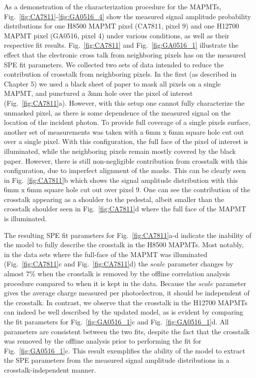 As a demonstration of the characterization procedure for the MAPMTs, Fig.~\ref{fig:CA7811}-\ref{fig:GA0516_4} show the measured signal amplitude probability distributions for one H8500 MAPMT pixel (CA7811, pixel 9) and one H12700 MAPMT pixel (GA0516, pixel 4) under various conditions, as well as their respective fit results. 
Fig.~\ref{fig:CA7811} and Fig.~\ref{fig:GA0516_1} illustrate the effect that the electronic cross talk from neighboring pixels has on the measured SPE fit parameters. 
We collected two sets of data intended to reduce the contribution of crosstalk from neighboring pixels. 
In the first (as described in Chapter 5) we used a black sheet of paper to mask all pixels on a single MAPMT, and punctured a 3mm hole over the pixel of interest (Fig.~\ref{fig:CA7811}a). 
However, with this setup one cannot fully characterize the unmasked pixel, as there is some dependence of the measured signal on the location of the incident photon. 
To provide full coverage of a single pixel\textquotesingle s surface, another set of measurements was taken with a 6mm x 6mm square hole cut out over a single pixel. 
With this configuration, the full face of the pixel of interest is illuminated, while the neighboring pixels remain mostly covered by the black paper. 
However, there is still non-negligible contribution from crosstalk with this configuration, due to imperfect alignment of the masks. 
This can be clearly seen in Fig.~\ref{fig:CA7811}b which shows the signal amplitude distribution with this 6mm x 6mm square hole cut out over pixel 9. 
One can see the contribution of the crosstalk appearing as a shoulder to the pedestal, albeit smaller than the crosstalk shoulder seen in Fig.~\ref{fig:CA7811}d where the full face of the MAPMT is illuminated. 

The resulting SPE fit parameters for Fig.~\ref{fig:CA7811}a-d indicate the inability of the model to fully describe the crosstalk in the H8500 MAPMTs. 
Most notably, in the data sets where the full-face of the MAPMT was illuminated (Fig.~\ref{fig:CA7811}c and Fig.~\ref{fig:CA7811}d) the $scale$ parameter changes by almost $7\%$ when the crosstalk is removed by the offline correlation analysis procedure compared to when it is kept in the data. 
Because the $scale$ parameter gives the average charge measured per photoelectron, it should be independent of the crosstalk. 
In contrast, we observe that the crosstalk in the H12700 MAPMTs can indeed be well described by the updated model, as is evident by comparing the fit parameters for Fig.~\ref{fig:GA0516_1}c and Fig.~\ref{fig:GA0516_1}d. 
All parameters are consistent between the two fits, despite the fact that the crosstalk was removed by the offline analysis prior to performing the fit for Fig.~\ref{fig:GA0516_1}c. 
This result exemplifies the ability of the model to extract the SPE parameters from the measured signal amplitude distributions in a crosstalk-independent manner. 

